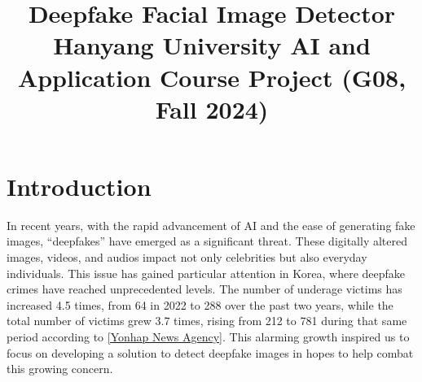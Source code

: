 \documentclass[conference]{IEEEtran}
\begin{document}
\title{Deepfake Facial Image Detector\\
{\large Hanyang University AI and Application Course Project (G08, Fall 2024)}}

\author{
\and
{}
\and
{}
\and
{}
}


\maketitle

\section*{Introduction}
In recent years, with the rapid advancement of AI and the ease of generating fake images, “deepfakes” have emerged as a significant threat. These digitally altered images, videos, and audios impact not only celebrities but also everyday individuals. This issue has gained particular attention in Korea, where deepfake crimes have reached unprecedented levels. The number of underage victims has increased 4.5 times, from 64 in 2022 to 288 over the past two years, while the total number of victims grew 3.7 times, rising from 212 to 781 during that same period according to \href{https://en.yna.co.kr/view/AEN20240828003100315}{[Yonhap News Agency]}. This alarming growth inspired us to focus on developing a solution to detect deepfake images in hopes to help combat this growing concern.
\end{document}

